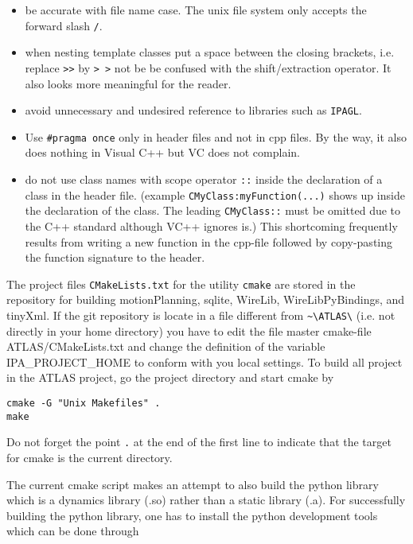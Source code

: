 \documentclass[11pt,a4paper,onepage,openany]{book}
\begin{document}
\begin{itemize}
  \item be accurate with file name case. The unix file system only accepts the
      forward slash \texttt{/}.
  \item when nesting template classes put a space between the closing brackets,
      i.e. replace \texttt{>>} by \texttt{> >} not be be confused with the
      shift/extraction operator. It also looks more meaningful for the reader.
  \item avoid unnecessary and undesired reference to libraries such as
      \texttt{IPAGL}.
  \item Use \texttt{\#pragma once} only in header files and not in cpp files.
      By the way, it also does nothing in Visual C++ but VC does not complain.
  \item do not use class names with scope operator \texttt{::} inside the
      declaration of a class in the header file. (example
      \texttt{CMyClass:myFunction(...)} shows up inside the declaration of the
      class. The leading \texttt{CMyClass::} must be omitted due to the C++
      standard although VC++ ignores is.) This shortcoming frequently results
      from writing a new function in the cpp-file followed by copy-pasting the
      function signature to the header.
\end{itemize}

The project files \texttt{CMakeLists.txt} for the utility \texttt{cmake} are
stored in the repository for building motionPlanning, sqlite, WireLib, 
WireLibPyBindings, and tinyXml. If the git repository is locate in a file 
different from \verb"~\ATLAS\" (i.e. not directly in your home directory) 
you have to edit the file master cmake-file ATLAS/CMakeLists.txt and change 
the definition of the variable IPA\_PROJECT\_HOME to conform with you local settings.
To build all project in the ATLAS project, go the project directory and start cmake by

\begin{verbatim}
cmake -G "Unix Makefiles" .
make
\end{verbatim}

Do not forget the point \texttt{.} at the
end of the first line to indicate that the target for cmake is the current
directory.

The current cmake script makes an attempt to also build the python library
which is a dynamics library (.so) rather than a static library (.a). For
successfully building the python library, one has to install the python
development tools which can be done through
\end{document}
